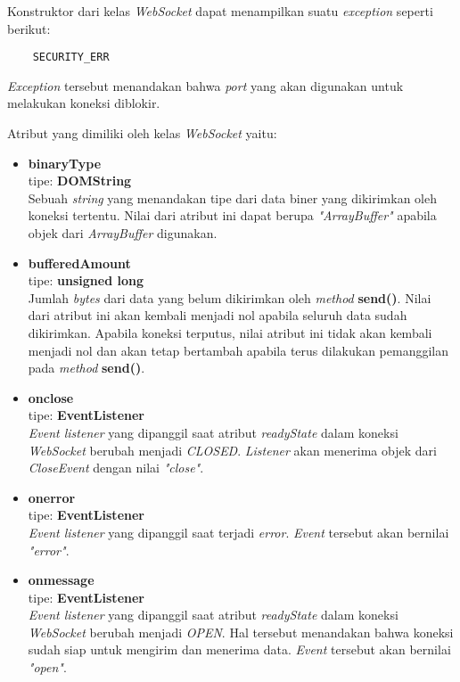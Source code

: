 Konstruktor dari kelas \textit{WebSocket} dapat menampilkan suatu \textit{exception} seperti berikut:

\begin{lstlisting}
	SECURITY_ERR
\end{lstlisting}

\textit{Exception} tersebut menandakan bahwa \textit{port} yang akan digunakan untuk melakukan koneksi diblokir.

Atribut yang dimiliki oleh kelas \textit{WebSocket} yaitu:

\begin{itemize}
	\item \textbf{binaryType} \\ tipe: \textbf{DOMString} \\ Sebuah \textit{string} yang menandakan tipe dari data biner yang dikirimkan oleh koneksi tertentu. Nilai dari atribut ini dapat berupa \textit{"ArrayBuffer"} apabila objek dari \textit{ArrayBuffer} digunakan.
	
	\item \textbf{bufferedAmount} \\ tipe: \textbf{unsigned long} \\ Jumlah \textit{bytes} dari data yang belum dikirimkan oleh \textit{method} \textbf{send()}. Nilai dari atribut ini akan kembali menjadi nol apabila seluruh data sudah dikirimkan. Apabila koneksi terputus, nilai atribut ini tidak akan kembali menjadi nol dan akan tetap bertambah apabila terus dilakukan pemanggilan pada \textit{method} \textbf{send()}.
	
	\item \textbf{onclose} \\ tipe: \textbf{EventListener} \\ \textit{Event listener} yang dipanggil saat atribut \textit{readyState} dalam koneksi \textit{WebSocket} berubah menjadi \textit{CLOSED}. \textit{Listener} akan menerima objek dari \textit{CloseEvent} dengan nilai \textit{"close"}.
	
	\item \textbf{onerror} \\ tipe: \textbf{EventListener} \\ \textit{Event listener} yang dipanggil saat terjadi \textit{error}. \textit{Event} tersebut akan bernilai \textit{"error"}.
	
	\item \textbf{onmessage} \\ tipe: \textbf{EventListener} \\ \textit{Event listener} yang dipanggil saat atribut \textit{readyState} dalam koneksi \textit{WebSocket} berubah menjadi \textit{OPEN}. Hal tersebut menandakan bahwa koneksi sudah siap untuk mengirim dan menerima data. \textit{Event} tersebut akan bernilai \textit{"open"}.
	

\end{itemize}
